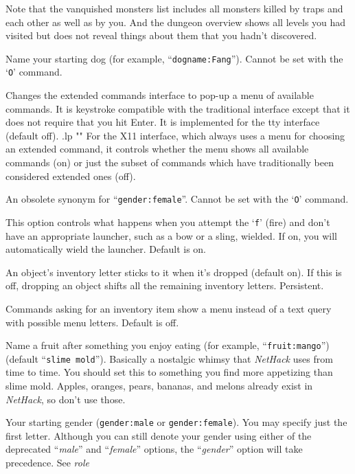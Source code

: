\documentclass[titlepage]{article}
\begin{document}
\begin{description}[font=\mdseries\itshape]
Note that the vanquished monsters list includes all monsters killed by
traps and each other as well as by you.
And the dungeon overview shows all levels you had visited but does not
reveal things about them that you hadn't discovered.
\item[dogname]
Name your starting dog (for example, ``\texttt{dogname:Fang}'').
Cannot be set with the `\texttt{O}' command.
\item[extmenu]
Changes the extended commands interface to pop-up a menu of available commands.
It is keystroke compatible with the traditional interface except that it does
not require that you hit Enter.
It is implemented for the tty interface (default off).
.lp ""
For the X11 interface, which always uses a menu for choosing an extended
command, it controls whether the menu shows all available commands (on)
or just the subset of commands which have traditionally been considered
extended ones (off).
\item[female]
An obsolete synonym for ``\texttt{gender:female}''.  Cannot be set with the
`\texttt{O}' command.
\item[fireassist]
This option controls what happens when you attempt the `\texttt{f}' (fire)
and don't have an appropriate launcher, such as a bow or a sling, wielded.
If on, you will automatically wield the launcher. Default is on.
\item[fixinv]
An object's inventory letter sticks to it when it's dropped (default on).
If this is off, dropping an object shifts all the remaining inventory letters.
Persistent.
\item[force\textunderscore invmenu]
Commands asking for an inventory item show a menu instead of
a text query with possible menu letters. Default is off.
\item[fruit]
Name a fruit after something you enjoy eating (for example, ``\texttt{fruit:mango}'')
(default ``\texttt{slime mold}''). Basically a nostalgic whimsy that
\textit{NetHack} uses from time to time.  You should set this to something you
find more appetizing than slime mold.  Apples, oranges, pears, bananas, and
melons already exist in \textit{NetHack}, so don't use those.
\item[gender]
Your starting gender (\texttt{gender:male} or \texttt{gender:female}).
You may specify just the first letter.
Although you can
still denote your gender using either of the deprecated
``\textit{male}'' and ``\textit{female}''
options, the ``\textit{gender}'' option will take precedence.
See \textit{role}

\end{description}
\end{document}
